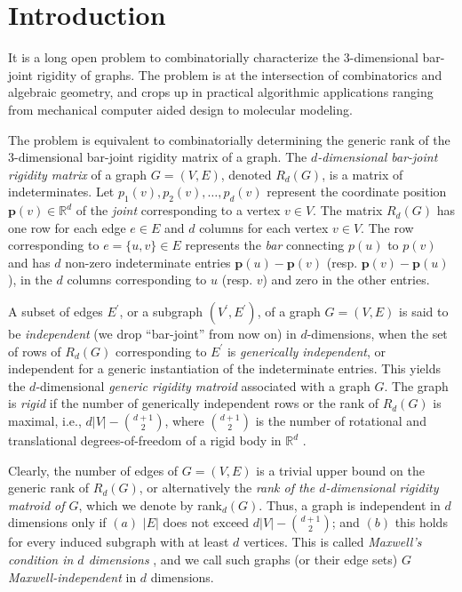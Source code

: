 \documentclass[10pt]{article}
\def \p {\mathbf{p}}
\begin{document}
\section{Introduction}\label{sec:intro}
It is a long open problem to combinatorially characterize the $3$-dimensional bar-joint rigidity of graphs.
The problem is at the intersection of combinatorics and
algebraic geometry, and  crops up in practical algorithmic applications ranging from
mechanical computer aided design to
molecular modeling.

\medskip\noindent
The problem is equivalent to combinatorially determining
the generic rank of the $3$-dimensional bar-joint rigidity matrix of a graph.
The {\em $d$-dimensional bar-joint rigidity matrix} of a graph  $G = (V,E)$, denoted $R_d(G)$,
is a matrix of indeterminates. Let $p_1(v), p_2(v), \ldots, p_d(v)$ represent the coordinate position $\p(v) \in \mathbb{R}^d$ of
the {\em joint} corresponding to a
vertex $v\in V$.
The matrix $R_d(G)$ has one row for each edge $e\in E $ and $d$ columns for
each vertex $v \in V$.
The row corresponding to $e = \{u, v\} \in E$
represents the {\em bar}
connecting $p(u)$ to $p(v)$ and has $d$ non-zero indeterminate entries
$\p(u)-\p(v)$ (resp. $\p(v)-\p(u)$), in the $d$ columns corresponding to $u$
(resp. $v$) and zero in the other entries.

\medskip\noindent
A subset of edges $E^\prime$, or a subgraph $(V^\prime, E^\prime)$, of a graph $G=(V, E)$ is said to be {\em independent} (we drop ``bar-joint'' from now on) in $d$-dimensions, when the set of rows of $R_d(G)$ corresponding to $E^\prime$ is {\em generically independent}, or independent for a generic instantiation of the indeterminate entries.
This yields the $d$-dimensional {\em generic rigidity matroid} associated with a graph $G$. The graph is {\em rigid} if the number of generically independent rows or
the rank of $R_d(G)$  is maximal, i.e., $d|V| - {d+1 \choose 2}$, where
${d+1 \choose 2}$ is the number of rotational and translational degrees-of-freedom of a rigid body in $\mathbb{R}^d$ \cite{graver:servatius:rigidityBook:1993}.

\medskip\noindent
Clearly, the number of edges of $G=(V, E)$ is a trivial upper bound on the generic rank of
$R_d(G)$, or alternatively the {\it rank of the $d$-dimensional rigidity matroid of $G$}, which we denote by rank$_d(G)$. Thus, a graph is independent in $d$ dimensions only if $(a)$ $|E|$ does not exceed $d|V| - {d+1\choose 2}$; and $(b)$ this holds for every induced subgraph with at least $d$ vertices. This is called {\em Maxwell's condition in $d$ dimensions} \cite{maxwell:equilibrium:1864}, and we call such graphs (or their edge sets) $G$ {\em Maxwell-independent} in $d$ dimensions. 
\end{document}
